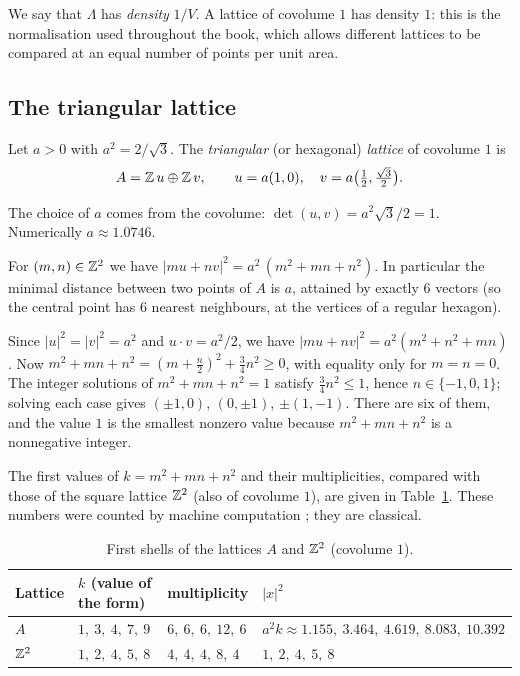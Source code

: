 We say that $\Lambda$ has \emph{density} $1/V$. A lattice of covolume $1$ has density $1$: this is the normalisation
used throughout the book, which allows different lattices to be compared at an equal number of points per unit area.

\subsection{The triangular lattice}

\begin{definition}\label{ch1:def:A}
Let $a>0$ with $a^2=2/\sqrt3$. The \emph{triangular} (or hexagonal) \emph{lattice} of covolume $1$ is
\[
  A=\mathbb{Z}\,u\oplus\mathbb{Z}\,v,\qquad u=a(1,0),\quad v=a\bigl(\tfrac12,\tfrac{\sqrt3}{2}\bigr).
\]
\end{definition}

The choice of $a$ comes from the covolume: $\det(u,v)=a^2\sqrt3/2=1$. Numerically $a\approx 1.0746$.

\begin{proposition}[Norms in $A$]\label{ch1:prop:normesA}
For $(m,n)\in\mathbb{Z}^2$ we have $|mu+nv|^2=a^2\,(m^2+mn+n^2)$. In particular the minimal distance between two points of $A$ is $a$, attained
by exactly $6$ vectors (so the central point has $6$ nearest neighbours, at the vertices of a regular hexagon). \tierC{}
\end{proposition}

\begin{humanproof}
Since $|u|^2=|v|^2=a^2$ and $u\cdot v=a^2/2$, we have $|mu+nv|^2=a^2(m^2+n^2+mn)$. Now
$m^2+mn+n^2=(m+\tfrac n2)^2+\tfrac34n^2\ge0$, with equality only for $m=n=0$. The integer solutions of
$m^2+mn+n^2=1$ satisfy $\tfrac34 n^2\le 1$, hence $n\in\{-1,0,1\}$; solving each case gives $(\pm1,0)$, $(0,\pm1)$,
$\pm(1,-1)$. There are six of them, and the value $1$ is the smallest nonzero value because $m^2+mn+n^2$ is a nonnegative integer.
\end{humanproof}

The first values of $k=m^2+mn+n^2$ and their multiplicities, compared with those of the square lattice $\mathbb{Z}^2$ (also of covolume $1$),
are given in Table~\ref{ch1:tab:couches}. These numbers were counted by machine computation \tierX{}; they are classical.

\begin{table}[ht]
\centering
\begin{tabular}{@{}llll@{}}
\toprule
Lattice & $k$ (value of the form) & multiplicity & $|x|^2$ \\
\midrule
$A$ & $1,\ 3,\ 4,\ 7,\ 9$ & $6,\ 6,\ 6,\ 12,\ 6$ & $a^2k\approx 1.155,\ 3.464,\ 4.619,\ 8.083,\ 10.392$ \\
$\mathbb{Z}^2$ & $1,\ 2,\ 4,\ 5,\ 8$ & $4,\ 4,\ 4,\ 8,\ 4$ & $1,\ 2,\ 4,\ 5,\ 8$ \\
\bottomrule
\end{tabular}
\caption{First shells of the lattices $A$ and $\mathbb{Z}^2$ (covolume $1$).}
\label{ch1:tab:couches}
\end{table}

